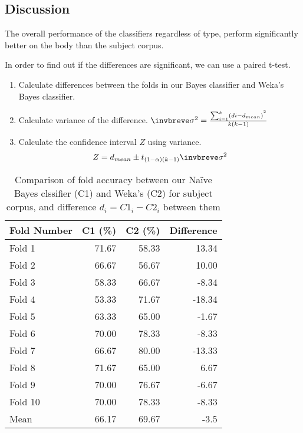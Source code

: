 \documentclass[10pt, a4paper]{article}
\begin{document}
\subsection{Discussion}

%

The overall performance of the classifiers regardless of type, perform significantly better on the body than the subject corpus.

In order to find out if the differences are significant, we can use a paired t-test.

\begin{enumerate}
\item Calculate differences between the folds in our Bayes classifier and Weka's Bayes classifier.
\item Calculate variance of the difference.
$\invbreve\sigma ^{2} = \frac{{\sum\nolimits_{i=1}^k (di-d_{mean})}^2 }{k(k-1)}$
\item Calculate the confidence interval $Z$ using variance.
$$ Z = d_{mean} \pm t_{(1-\alpha)(k-1)} \invbreve\sigma ^{2} $$
\end{enumerate}

\begin{table}[H]
\centering
\caption{Comparison of fold accuracy between our Na\"ive Bayes clssifier (C1) and Weka's (C2) for subject corpus, and difference $d_{i} = C1_{i} - C2_{i}$ between them}\vspace{1em}
\begin{tabular}{@{}lrrr@{}}
\toprule
\textbf{Fold Number} & \textbf{C1 (\%)} & \textbf{C2 (\%)}
	& \textbf{Difference} \\
\midrule
Fold 1 & 71.67 & 58.33 & 13.34 \\
Fold 2 & 66.67 & 56.67 & 10.00 \\
Fold 3 & 58.33 & 66.67 & -8.34 \\
Fold 4 & 53.33 & 71.67 & -18.34 \\
Fold 5 & 63.33 & 65.00 & -1.67 \\
Fold 6 & 70.00 & 78.33 & -8.33 \\
Fold 7 & 66.67 & 80.00 & -13.33 \\
Fold 8 & 71.67 & 65.00 & 6.67 \\
Fold 9 & 70.00 & 76.67 & -6.67 \\
Fold 10 & 70.00 & 78.33 & -8.33 \\
\bottomrule
Mean & 66.17 & 69.67 & -3.5 \\
\bottomrule
\end{tabular}
\label{table:diffsubj}
\end{table}
\end{document}
